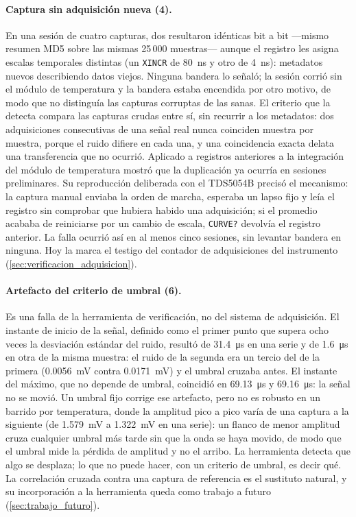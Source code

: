 \paragraph{Captura sin adquisición nueva (4).} En una sesión de cuatro
capturas, dos resultaron idénticas bit a bit ---mismo resumen MD5 sobre
las mismas 25\,000 muestras--- aunque el registro les asigna escalas
temporales distintas (un \texttt{XINCR} de \SI{80}{\nano\second} y otro
de \SI{4}{\nano\second}): metadatos nuevos describiendo datos viejos.
Ninguna bandera lo señaló; la sesión corrió sin el módulo de
temperatura y la bandera estaba encendida por otro motivo, de modo que
no distinguía las capturas corruptas de las sanas. El criterio que la
detecta compara las capturas crudas entre sí, sin recurrir a los
metadatos: dos adquisiciones consecutivas de una señal real nunca
coinciden muestra por muestra, porque el ruido difiere en cada una, y
una coincidencia exacta delata una transferencia que no ocurrió.
Aplicado a registros anteriores a la integración del módulo de
temperatura mostró que la duplicación ya ocurría en sesiones
preliminares. Su reproducción deliberada con el TDS5054B precisó el
mecanismo: la captura manual enviaba la orden de marcha, esperaba un
lapso fijo y leía el registro sin comprobar que hubiera habido una
adquisición; si el promedio acababa de reiniciarse por un cambio de
escala, \texttt{CURVE?} devolvía el registro anterior. La falla ocurrió
así en al menos cinco sesiones, sin levantar bandera en ninguna. Hoy la
marca el testigo del contador de adquisiciones del instrumento
(\cref{sec:verificacion_adquisicion}).

\paragraph{Artefacto del criterio de umbral (6).} Es una falla de la
herramienta de verificación, no del sistema de adquisición. El instante
de inicio de la señal, definido como el primer punto que supera ocho
veces la desviación estándar del ruido, resultó de
\SI{31.4}{\micro\second} en una serie y de \SI{1.6}{\micro\second} en
otra de la misma muestra: el ruido de la segunda era un tercio del de
la primera (\SI{0.0056}{\milli\volt} contra \SI{0.0171}{\milli\volt}) y
el umbral cruzaba antes. El instante del máximo, que no depende de
umbral, coincidió en \SI{69.13}{\micro\second} y
\SI{69.16}{\micro\second}: la señal no se movió. Un umbral fijo corrige
ese artefacto, pero no es robusto en un barrido por temperatura, donde
la amplitud pico a pico varía de una captura a la siguiente (de
\SI{1.579}{\milli\volt} a \SI{1.322}{\milli\volt} en una serie): un
flanco de menor amplitud cruza cualquier umbral más tarde sin que la
onda se haya movido, de modo que el umbral mide la pérdida de amplitud
y no el arribo. La herramienta detecta que algo se desplaza; lo que no
puede hacer, con un criterio de umbral, es decir qué. La correlación
cruzada contra una captura de referencia es el sustituto natural, y
su incorporación a la herramienta queda como trabajo a futuro (\cref{sec:trabajo_futuro}).

